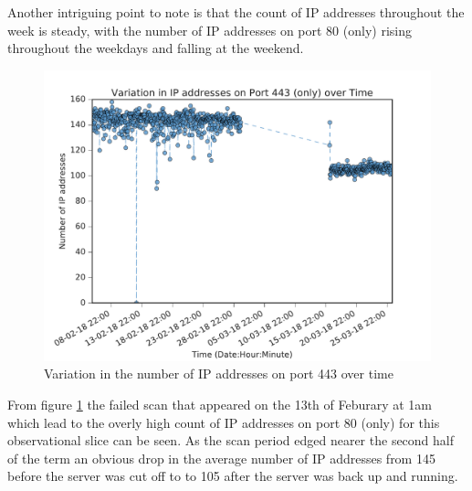 \documentclass[a4wide,leqno,12pt]{report}
\begin{document}
Another intriguing  point to note is that the count of IP addresses throughout the week is steady, with the number of IP addresses on port 80 (only) rising throughout the weekdays and falling at the weekend.\\

\begin{figure}[H]
\centering
\includegraphics[scale=.5]{pdf_images/Ip_p443_alpha}
\caption{Variation in the number of IP addresses on port 443 over time}
\label{fig:port443ZMap}
\end{figure}

From figure \ref{fig:port443ZMap} the failed scan that appeared on the 13th of Feburary at 1am which lead to the overly high count of IP addresses on port 80 (only) for this observational slice can be seen. As the scan period edged nearer the second half of the term an obvious drop in the average number of IP addresses from 145 before the server was cut off to to 105 after the server was back up and running.
\end{document}
